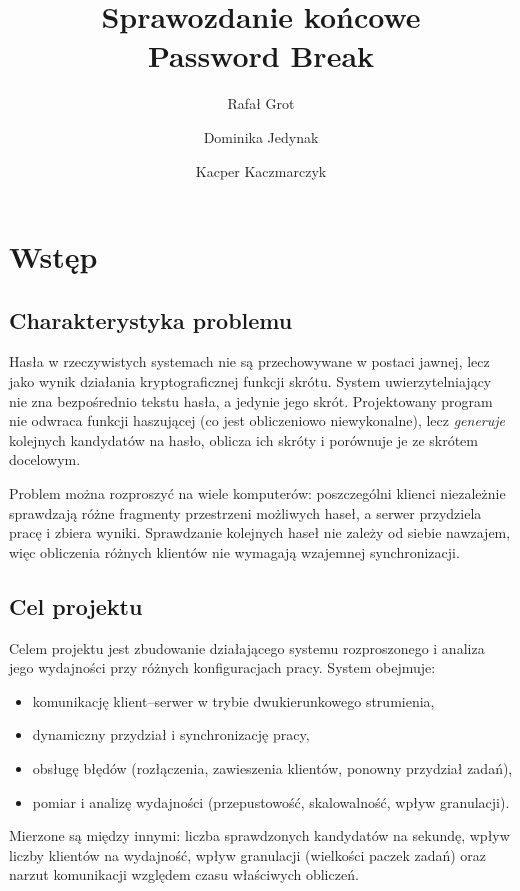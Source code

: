 \documentclass[11pt,a4paper]{article}
\title{Sprawozdanie końcowe \\[0.3em] \large Password Break}
\author{Rafał Grot \and Dominika Jedynak \and Kacper Kaczmarczyk}
\date{\the\year}
\begin{document}
\maketitle

\tableofcontents
\newpage

\section{Wstęp}

\subsection{Charakterystyka problemu}
Hasła w rzeczywistych systemach nie są przechowywane w postaci jawnej, lecz jako wynik
działania kryptograficznej funkcji skrótu. System uwierzytelniający nie zna bezpośrednio
tekstu hasła, a jedynie jego skrót. Projektowany program nie odwraca funkcji haszującej (co
jest obliczeniowo niewykonalne), lecz \emph{generuje} kolejnych kandydatów na hasło, oblicza ich
skróty i porównuje je ze skrótem docelowym.

Problem można rozproszyć na wiele komputerów: poszczególni klienci niezależnie sprawdzają
różne fragmenty przestrzeni możliwych haseł, a serwer przydziela pracę i zbiera wyniki.
Sprawdzanie kolejnych haseł nie zależy od siebie nawzajem, więc obliczenia różnych klientów
nie wymagają wzajemnej synchronizacji.

\subsection{Cel projektu}
Celem projektu jest zbudowanie działającego systemu rozproszonego i analiza jego wydajności
przy różnych konfiguracjach pracy. System obejmuje:
\begin{itemize}
  \item komunikację klient--serwer w trybie dwukierunkowego strumienia,
  \item dynamiczny przydział i synchronizację pracy,
  \item obsługę błędów (rozłączenia, zawieszenia klientów, ponowny przydział zadań),
  \item pomiar i analizę wydajności (przepustowość, skalowalność, wpływ granulacji).
\end{itemize}

Mierzone są między innymi: liczba sprawdzonych kandydatów na sekundę, wpływ liczby klientów
na wydajność, wpływ granulacji (wielkości paczek zadań) oraz narzut komunikacji względem
czasu właściwych obliczeń.
\end{document}
